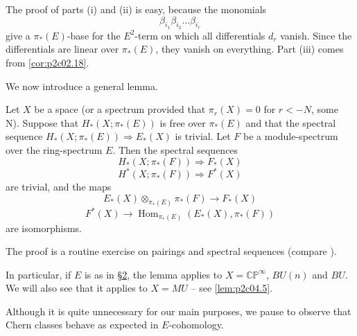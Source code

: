 \documentclass[../main]{subfiles}
\begin{document}
The proof of parts (i) and (ii) is easy, because the monomials
$$\beta_{i_1}\beta_{i_2}...\beta_{i_r}$$
give a $\pi_\ast(E)$-base for the $E^2$-term on which all differentials $d_r$ vanish. Since the differentials are linear over $\pi_\ast(E)$, they vanish on everything. Part (iii) comes from \eqref{cor:p2c02.18}.

We now introduce a general lemma.
\begin{lemma}
\label{lem:p2c04.2}
Let $X$ be a space (or a spectrum provided that $\pi_r(X)=0$ for $r<-N$, some N). Suppose that $H_\ast(X;\pi_\ast(E))$ is free over $\pi_\ast(E)$ and that the spectral sequence $H_\ast(X;\pi_\ast(E))\Longrightarrow E_\ast(X)$ is trivial. Let $F$ be a module-spectrum over the ring-spectrum $E$. Then the spectral sequences
$$H_\ast(X;\pi_\ast(F))\Longrightarrow F_\ast(X)$$
$$H^\ast(X;\pi_\ast(F))\Longrightarrow F^\ast(X)$$
are trivial, and the maps
$$E_\ast(X)\otimes_{\pi_\ast(E)}\pi_\ast(F)\longrightarrow F_\ast(X)$$
$$F^\ast(X)\longrightarrow \operatorname{Hom}_{\pi_\ast(E)}(E_\ast(X),\pi_\ast(F))$$
are isomorphisms.
\end{lemma}

The proof is a routine exercise on pairings and spectral sequences (compare \cite[p.~20, Proposition 17]{adams3}).

In particular, if $E$ is as in \hyperref[sec:p2c2]{\S 2}, the lemma applies to $X=\mathbb{CP}^\infty$, $BU(n)$ and $BU$. We will also see that it applies to $X=MU$ -- see \eqref{lem:p2c04.5}.

Although it is quite unnecessary for our main purposes, we pause to observe that Chern classes behave as expected in $E$-cohomology.
\end{document}
